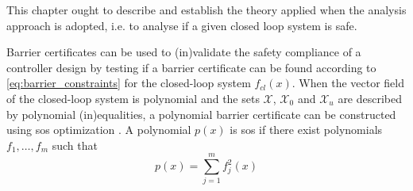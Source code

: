 This chapter ought to describe and establish the theory applied when the analysis approach is adopted, i.e. to analyse if a given closed loop system is safe.

Barrier certificates can be used to (in)validate the safety compliance of a controller design by testing if a barrier certificate can be found according to \autoref{eq:barrier_constraints} for the closed-loop system $f_{cl}(x)$. When the vector field of the closed-loop system is polynomial and the sets $\mathcal{X}$, $\mathcal{X}_0$ and $\mathcal{X}_u$ are described by polynomial (in)equalities, a polynomial barrier certificate can be constructed using \gls{sos} optimization \citep{bib:prajna_framework}. A polynomial $p(x)$ is \gls{sos} if there exist polynomials $f_1,\dots,f_m$ such that \citep{bib:parrilo_sdp}
\begin{equation}
p(x) = \sum_{j=1}^{m}f_j^2(x)
\end{equation}
%

